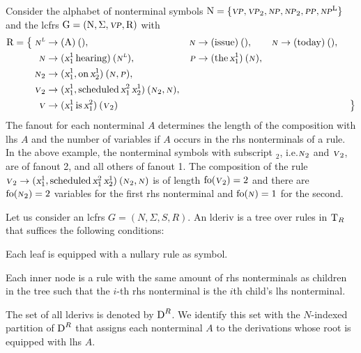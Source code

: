 \documentclass[../document.tex]{subfiles}
\begin{document}
    \begin{example}\label{ex:lcfrs:rules}
        Consider the alphabet of nonterminal symbols \(\mathrm{N} = \{\textsc{\textsl{vp}}, \textsc{\textsl{vp}}_2, \textsc{\textsl{np}}, \textsc{\textsl{np}}_2, \textsc{\textsl{pp}}, \textsc{\textsl{np}}^\text{L}\}\) and the \gls*{lcfrs} \(\mathrm{G} = (\mathrm{N}, \Sigma, \textsc{\textsl{vp}}, \mathrm{R})\) with
        \begin{align*}
            \mathrm{R} = \big\{\;
                \textsc{\textsl{n}}^{\textsc{\textsl{l}}} &\to (\text{A})\:(), &\textsc{\textsl{n}} &\to (\text{issue})\:(), &\textsc{\textsl{n}} &\to (\text{today})\:(), &\\
                \textsc{\textsl{n}} &\to (\textsl{x}_1^1 \, \text{hearing})\:(\textsc{\textsl{n}}^{\textsc{\textsl{l}}}), &\textsc{\textsl{p}} &\to (\text{the}\,\textsl{x}_1^1)\:(\textsc{\textsl{n}}), \\
                \textsc{\textsl{n}}_2 &\to (\textsl{x}_1^1, \text{on} \, \textsl{x}_2^1)\:(\textsc{\textsl{n}}, \textsc{\textsl{p}}), \\
                \textsc{\textsl{v}}_2 &\to (\textsl{x}_1^1, \text{scheduled} \, \textsl{x}_1^2 \, \textsl{x}_2^1)\:(\textsc{\textsl{n}}_2, \textsc{\textsl{n}}), \\
                \textsc{\textsl{v}} &\to (\textsl{x}_1^1 \, \text{is} \, \textsl{x}_1^2)\:(\textsc{\textsl{v}}_2)
            &&&&&\;\big\}
        \end{align*}
        The fanout for each nonterminal \(A\) determines the length of the composition with \gls*{lhs} \(A\) and the number of variables if \(A\) occurs in the \gls*{rhs} nonterminals of a rule.
        In the above example, the nonterminal symbols with subscript \(_2\), i.e.\@ \(\textsc{\textsl{n}}_2\) and \(\textsc{\textsl{v}}_2\), are of fanout 2, and all others of fanout 1.
        The composition of the rule \(\textsc{\textsl{v}}_2 \to (\textsl{x}_1^1, \text{scheduled} \, \textsl{x}_1^2 \, \textsl{x}_2^1)\:(\textsc{\textsl{n}}_2, \textsc{\textsl{n}})\) is of length \(\operatorname{fo}(\textsc{\textsl{v}}_2) = 2\) and there are \(\operatorname{fo}(\textsc{\textsl{n}}_2) = 2\) variables for the first \gls*{rhs} nonterminal and \(\operatorname{fo}(\textsc{\textsl{n}}) = 1\) for the second.
    \end{example}

    \begin{definition}[Derivation]
        Let us consider an lcfrs \(G = (N, \varSigma, S, R)\).
        An \gls{lderiv} is a tree over rules in \(\operatorname{T}_R\) that suffices the following conditions:
        \begin{compactitem}
            \item Each leaf is equipped with a nullary rule as symbol.
            \item Each inner node is a rule with the same amount of \gls{rhs} nonterminals as children in the tree such that the \(i\)-th \gls{rhs} nonterminal is the \(i\)th child's \gls{lhs} nonterminal.
        \end{compactitem}
        The set of all \glspl{lderiv} is denoted by \(\operatorname{D}^R\).
        We identify this set with the \(N\)-indexed partition of \(\operatorname{D}^R\) that assigns each nonterminal \(A\) to the derivations whose root is equipped with \gls{lhs} \(A\).
    \end{definition}
\end{document}
